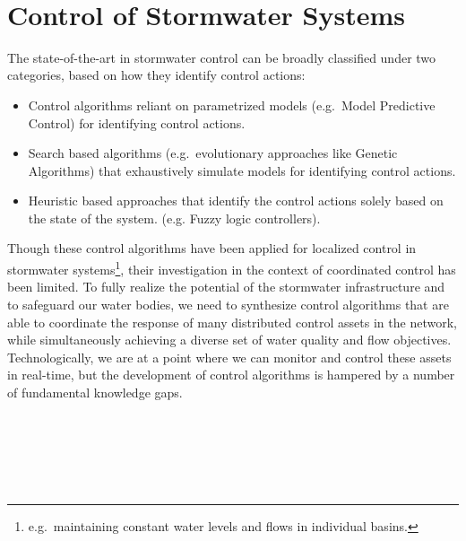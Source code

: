 \ 

\section{Control of Stormwater Systems} 
The state-of-the-art in stormwater control can be broadly classified under two categories, based on how they identify control actions:
\begin{itemize}
	\item Control algorithms reliant on parametrized models (e.g.\ Model Predictive Control) for identifying control actions.
	\item Search based algorithms (e.g.\ evolutionary approaches like Genetic Algorithms) that exhaustively simulate models for identifying control actions.
	\item Heuristic based approaches that identify the control actions solely based on the state of the system. (e.g. Fuzzy logic controllers). 
\end{itemize}
Though these control algorithms have been applied for localized control in stormwater systems\footnote{e.g.\ maintaining constant water levels and flows in individual basins.}, their investigation in the context of coordinated control has been limited.
To fully realize the potential of the stormwater infrastructure and to safeguard our water bodies, we need to synthesize control algorithms that are able to coordinate the response of many distributed control assets in the network, while simultaneously achieving a diverse set of water quality and flow objectives. 
Technologically, we are at a point where we can monitor and control these assets in real-time, but the development of control algorithms is hampered by a number of fundamental knowledge gaps.

\


\


\

